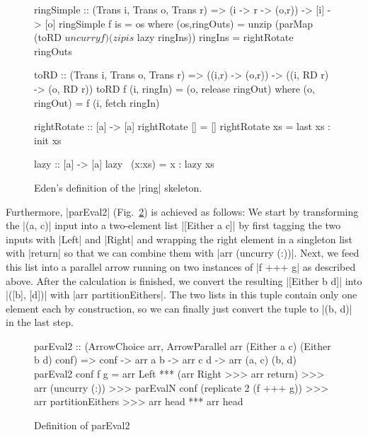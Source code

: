 \begin{figure}[h]
\begin{code}
ringSimple :: (Trans i, Trans o, Trans r) => (i -> r -> (o,r)) -> [i] -> [o]
ringSimple f is =  os
  where (os,ringOuts) = unzip (parMap (toRD $ uncurry f) (zip is $ lazy ringIns))
        ringIns = rightRotate ringOuts

toRD :: (Trans i, Trans o, Trans r) => ((i,r) -> (o,r)) -> ((i, RD r) -> (o, RD r))
toRD  f (i, ringIn)  = (o, release ringOut)
  where (o, ringOut) = f (i, fetch ringIn)

rightRotate    :: [a] -> [a]
rightRotate [] =  []
rightRotate xs =  last xs : init xs

lazy :: [a] -> [a]
lazy ~(x:xs) = x : lazy xs
\end{code}
\caption{Eden's definition of the |ring| skeleton.}
\label{fig:ringEden}
\end{figure}

Furthermore, |parEval2| (Fig.~\ref{fig:parEval2}) is achieved as follows:
We start by transforming the |(a, c)| input into a two-element list |[Either a c]| by first tagging the two inputs with |Left| and |Right| and wrapping the right element in a singleton list with |return| so that we can combine them with |arr (uncurry (:))|. Next, we feed this list into a parallel arrow running on two instances of |f +++ g| as described above. After the calculation is finished, we convert the resulting |[Either b d]| into |([b], [d])| with |arr partitionEithers|. The two lists in this tuple contain only one element each by construction, so we can finally just convert the tuple to |(b, d)| in the last step.
\begin{figure}[h]
\begin{code}
parEval2 :: (ArrowChoice arr,
	ArrowParallel arr (Either a c) (Either b d) conf) =>
	conf -> arr a b -> arr c d -> arr (a, c) (b, d)
parEval2 conf f g =
	arr Left *** (arr Right >>> arr return) >>>
	arr (uncurry (:)) >>>
	parEvalN conf (replicate 2 (f +++ g)) >>>
	arr partitionEithers >>>
	arr head *** arr head
\end{code}
	\caption{Definition of parEval2}
	\label{fig:parEval2}
\end{figure}

